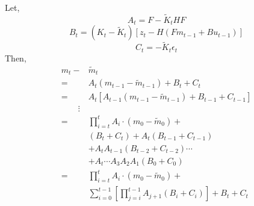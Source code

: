 \documentclass[letterpaper, 10 pt, conference]{ieeeconf}  %
\begin{document}
Let,
$$A_t = F - \tilde{K}_t HF$$
$$B_t = (K_t-\tilde{K}_t)[z_t-H(Fm_{t-1}+Bu_{t-1})]$$
$$C_t = - \tilde{K}_t \epsilon_t$$
Then,
\begin{equation}
\begin{split}
\label{Proposition2}
m_t  -& \tilde{m}_t \\
=& A_t (m_{t-1} - \tilde{m}_{t-1}) + B_t + C_t\\
=& A_t[A_{t-1}(m_{t-1} - \tilde{m}_{t-1}) + B_{t-1} + C_{t-1}]\\
\qquad \vdots \\
=&\prod_{i=t}^tA_i\cdot (m_0  - \tilde{m}_0)+ \\
&(B_t + C_t) + A_t (B_{t-1}+C_{t-1}) \\
&+  A_t A_{t-1}(B_{t-2}+C_{t-2}) \cdots \\
&+ A_t \cdots A_3 A_2 A_1(B_0 + C_0)  \\
= &\prod_{i=t}^tA_i\cdot (m_0  - \tilde{m}_0) + \\
&\sum_{i=0}^{t-1} \left[ \prod_{j=i}^{t-1}A_{j+1} (B_i + C_i) \right] +B_t + C_t
\end{split}
\end{equation}





\end{document}
